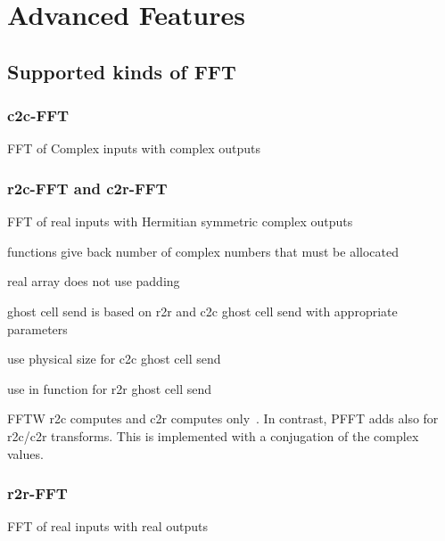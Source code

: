 \chapter{Advanced Features}\label{chap:feat}


\section{Supported kinds of FFT}

\subsection{c2c-FFT}
FFT of Complex inputs with complex outputs

\subsection{r2c-FFT and c2r-FFT}
FFT of real inputs with Hermitian symmetric complex outputs
\begin{compactitem}
  \item {} functions give back number of complex numbers that must be allocated
  \item real array does not use padding
  \item ghost cell send is based on r2r and c2c ghost cell send with appropriate parameters 
  \begin{compactitem}
    \item use physical size for c2c ghost cell send
    \item use  in  function for r2r ghost cell send
    \item FFTW r2c computes  and c2r computes  only~\cite{fftw-rdft}. In contrast, PFFT adds  also for r2c/c2r transforms.
          This is implemented with a conjugation of the complex values.
  \end{compactitem}
\end{compactitem}




\subsection{r2r-FFT}
FFT of real inputs with real outputs



